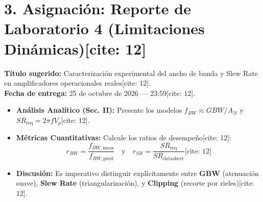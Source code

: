 \documentclass[11pt, a4paper]{article}
\begin{document}
\section*{3. Asignación: Reporte de Laboratorio 4 (Limitaciones Dinámicas)[cite: 12]}
\textbf{Título sugerido:} Caracterización experimental del ancho de banda y Slew Rate en amplificadores operacionales reales[cite: 12]. \\
\textbf{Fecha de entrega:} 25 de octubre de 2026 — 23:59[cite: 12].
\begin{itemize}
    \item \textbf{Análisis Analítico (Sec. II):} Presente los modelos $f_{BW} \approx GBW/A_N$ y $SR_{\mathrm{req}} = 2\pi f V_p$[cite: 12].
    \item \textbf{Métricas Cuantitativas:} Calcule los ratios de desempeño[cite: 12]:
    \begin{equation*}
        r_{BW} = \frac{f_{BW,\mathrm{meas}}}{f_{BW,\mathrm{pred}}} \quad \text{y} \quad r_{SR} = \frac{SR_{\mathrm{req}}}{SR_{\mathrm{datasheet}}} \text{[cite: 12]}
    \end{equation*}
    \item \textbf{Discusión:} Es imperativo distinguir explícitamente entre \textbf{GBW} (atenuación suave), \textbf{Slew Rate} (triangularización), y \textbf{Clipping} (recorte por rieles)[cite: 12].
\end{itemize}
\end{document}
